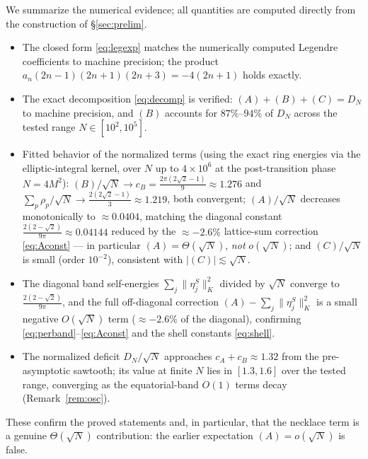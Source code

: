 \documentclass[11pt,reqno]{amsart}
\theoremstyle{definition}
\newcommand{\abs}[1]{\lvert #1\rvert}
\newcommand{\Def}{D_N}
\newcommand{\rp}{\rho}
\newcommand{\lesss}{\lesssim}
\begin{document}
We summarize the numerical evidence; all quantities are computed directly from the construction of
\S\ref{sec:prelim}.
\begin{itemize}[leftmargin=1.6em,itemsep=2pt]
\item The closed form \eqref{eq:legexp} matches the numerically computed Legendre coefficients to
      machine precision; the product $a_n(2n-1)(2n+1)(2n+3)=-4(2n+1)$ holds exactly.
\item The exact decomposition \eqref{eq:decomp} is verified: $(A)+(B)+(C)=\Def$ to machine
      precision, and $(B)$ accounts for $87\%$--$94\%$ of $\Def$ across the tested range
      $N\in[10^2,10^5]$.
\item Fitted behavior of the normalized terms (using the exact ring energies via the elliptic-integral
      kernel, over $N$ up to $4\times10^6$ at the post-transition phase $N=4M^2$):
      $(B)/\sqrt N\to c_B=\frac{2\pi(2\sqrt2-1)}{9}\approx1.276$ and
      $\sum_p\rp_p/\sqrt N\to\frac{2(2\sqrt2-1)}{3}\approx1.219$, both convergent;
      $(A)/\sqrt N$ decreases monotonically to $\approx0.0404$, matching the diagonal constant
      $\frac{2(2-\sqrt2)}{9\pi}\approx0.04144$ reduced by the $\approx-2.6\%$ lattice-sum correction
      \eqref{eq:Aconst} --- in particular $(A)=\Theta(\sqrt N)$, \emph{not} $o(\sqrt N)$; and
      $(C)/\sqrt N$ is small (order $10^{-2}$), consistent with $\abs{(C)}\lesss\sqrt N$.
\item The diagonal band self-energies $\sum_j\lVert\eta_j^S\rVert_K^2$ divided by $\sqrt N$ converge
      to $\frac{2(2-\sqrt2)}{9\pi}$, and the full off-diagonal correction $(A)-\sum_j\lVert\eta_j^S
      \rVert_K^2$ is a small negative $O(\sqrt N)$ term ($\approx-2.6\%$ of the diagonal), confirming
      \eqref{eq:perband}--\eqref{eq:Aconst} and the shell constants \eqref{eq:shell}.
\item The normalized deficit $\Def/\sqrt N$ approaches $c_A+c_B\approx1.32$ from the pre-asymptotic
      sawtooth; its value at finite $N$ lies in $[1.3,1.6]$ over the tested range, converging as the
      equatorial-band $O(1)$ terms decay (Remark~\ref{rem:osc}).
\end{itemize}
These confirm the proved statements and, in particular, that the necklace term is a genuine
$\Theta(\sqrt N)$ contribution: the earlier expectation $(A)=o(\sqrt N)$ is false.
\end{document}
